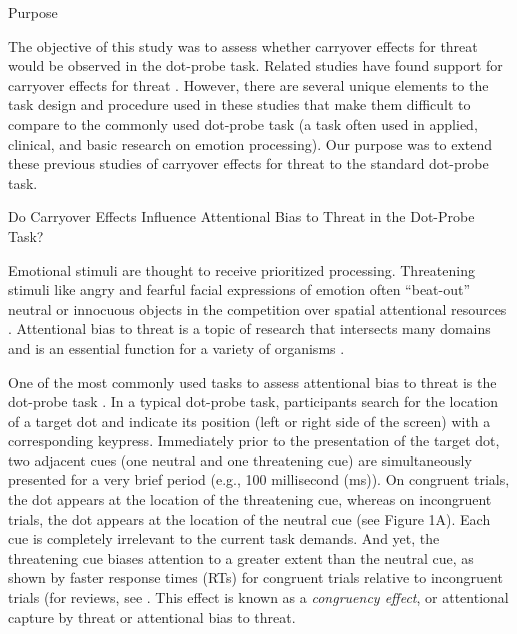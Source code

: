 \documentclass{article}
\begin{document}
	Purpose



	The objective of this study was to assess whether carryover effects for threat would be observed in the dot-probe task. Related studies have found support for carryover effects for threat \autocite{Gladwin2017}\autocite{Gladwin2017}\autocite{Gladwin2019}\autocite{Gladwin2020}\autocite{Gladwin2019a}. However, there are several unique elements to the task design and procedure used in these studies that make them difficult to compare to the commonly used dot-probe task (a task often used in applied, clinical, and basic research on emotion processing). Our purpose was to extend these previous studies of carryover effects for threat to the standard dot-probe task.























	Do Carryover Effects Influence Attentional Bias to Threat in the Dot-Probe Task?



	Emotional stimuli are thought to receive prioritized processing. Threatening stimuli like angry and fearful facial expressions of emotion often “beat-out” neutral or innocuous objects \autocite{Becker2017}\autocite{Schubö2006} in the competition over spatial attentional resources \autocite{Desimone1995}. Attentional bias to threat is a topic of research that intersects many domains and is an essential function for a variety of organisms \autocite{Anderson2019}.



	One of the most commonly used tasks to assess attentional bias to threat is the dot-probe task \autocite{MacLeod1986}. In a typical dot-probe task, participants search for the location of a target dot and indicate its position (left or right side of the screen) with a corresponding keypress. Immediately prior to the presentation of the target dot, two adjacent cues (one neutral and one threatening cue) are simultaneously presented for a very brief period (e.g., 100 millisecond (ms)). On congruent trials, the dot appears at the location of the threatening cue, whereas on incongruent trials, the dot appears at the location of the neutral cue (see Figure 1A). Each cue is completely irrelevant to the current task demands. And yet, the threatening cue biases attention to a greater extent than the neutral cue, as shown by faster response times (RTs) for congruent trials relative to incongruent trials (for reviews, see \autocite{Carretié2014}\autocite{Imhoff2019}. This effect is known as a \emph{congruency effect}, or attentional capture by threat or attentional bias to threat.
\end{document}
